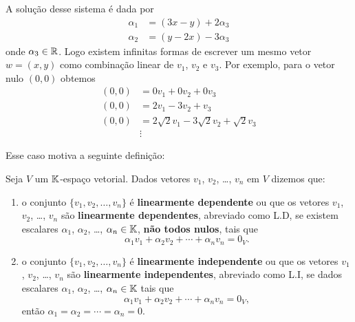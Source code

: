 A solução desse sistema é dada por
\begin{align*}
  \alpha_1 &= (3x - y) + 2\alpha_3\\
  \alpha_2 &= (y - 2x) - 3\alpha_3
\end{align*}
onde $\alpha_3 \in \mathbb{R}$. Logo existem infinitas formas de escrever um mesmo vetor $w = (x, y)$ como
combinação linear de $v_1$, $v_2$ e $v_3$. Por exemplo, para o vetor nulo $(0, 0)$ obtemos
\begin{align*}
  (0, 0) &= 0v_1 + 0v_2 + 0v_3\\
  (0, 0) &= 2v_1 - 3v_2 + v_3\\
  (0, 0) &= 2\sqrt{2}v_1 - 3\sqrt{2}v_2 + \sqrt{2}v_3\\
         &\vdots
\end{align*}

Esse caso motiva a seguinte definição:
\begin{definicao}
  Seja $V$ um $\mathbb{K}$-espaço vetorial. Dados vetores $v_1$, $v_2$, \dots, $v_n$ em $V$ dizemos que:
  \begin{enumerate}[label={\roman*})]
    \item o conjunto $\{v_1, v_2, \dots, v_n\}$ é \textbf{linearmente dependente} ou que os vetores $v_1$, $v_2$, \dots, $v_n$
      são \textbf{linearmente dependentes}, abreviado como L.D, se existem escalares
      $\alpha_1$, $\alpha_2$, \dots, $\alpha_n \in \mathbb{K}$, \textbf{não todos nulos}, tais que
      \[
        \alpha_1v_1 + \alpha_2v_2 + \cdots + \alpha_nv_n = 0_V.
      \]

    \item o conjunto $\{v_1, v_2, \dots, v_n\}$ é \textbf{linearmente independente} ou que os vetores $v_1$, $v_2$, \dots, $v_n$
      são \textbf{linearmente independentes}, abreviado como L.I, se dados escalares
      $\alpha_1$, $\alpha_2$, \dots, $\alpha_n \in \mathbb{K}$  tais que
      \[
        \alpha_1v_1 + \alpha_2v_2 + \cdots + \alpha_nv_n = 0_V,
      \]
      então $\alpha_1 = \alpha_2 = \cdots = \alpha_n = 0$.
  \end{enumerate}
\end{definicao}

